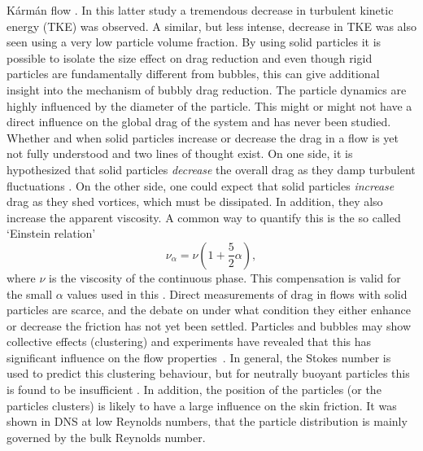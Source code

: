 K\'arm\'an flow \citep{Cisse2015}. In this latter study a tremendous decrease
in turbulent kinetic energy (TKE) was observed. A similar, but less intense,
decrease in TKE was also seen using a very low particle volume
fraction\citep{Bellani2012b}. By using solid particles it is possible to
isolate the size effect on drag reduction and even though rigid particles are
fundamentally different from bubbles, this can give additional insight into
the mechanism of bubbly drag reduction.  The particle dynamics are highly
influenced by the diameter of the particle\citep{Machicoane2016}. This might
or might not have a direct influence on the global drag of the system and has
never been studied.
%
Whether and when solid particles increase or decrease the drag in a flow is
yet not fully understood and two lines of thought exist. On one side, it is
hypothesized that solid particles {\it decrease} the overall drag as they damp
turbulent fluctuations \citep{Zhao2010,Poelma2007}. On the other side, one
could expect that solid particles {\it increase} drag as they shed vortices,
which must be dissipated. In addition, they also increase the apparent
viscosity. A common way to quantify this is the so called `Einstein
relation'~\citep{Einstein1906}
\begin{equation} \nu_\alpha = \nu\left(1 +
\frac{5}{2}\alpha \right), \label{eq:einstein} \end{equation} where $\nu$ is
the viscosity of the continuous phase. This compensation is valid for the
small $\alpha$ values used in this \docname \citep{Stickel2005}. Direct
measurements of drag in flows with solid particles are scarce, and the debate
on under what condition they either enhance or decrease the friction has not
yet been settled. Particles and bubbles may show collective effects
(clustering) and experiments have revealed that this has significant influence
on the flow properties~\citep{Liu1993, Kulick1994, Muste1997, So2002,
Fujiwara2004, vandenBerg2005, vandenBerg2007, Shawkat2008, Calzavarini2008,
Colin2012, vanGils2013, Maryami2014, Mathai2015,
Almeras2017,Mathai2018}. In general, the Stokes number is used to
predict this clustering behaviour, but for neutrally buoyant particles this is
found to be insufficient \citep{Bragg2015,Fiabane2012}. In addition, the
position of the particles (or the particles clusters) is likely to have a
large influence on the skin friction.  It was shown in DNS at low Reynolds
numbers, that the particle distribution is mainly
governed by the bulk Reynolds number\citep{Kazerooni2017}.

